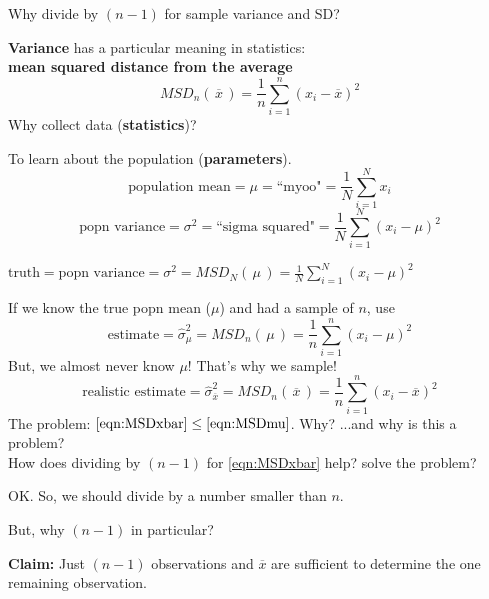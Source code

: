 \documentclass{beamer}\usepackage[]{graphicx}\usepackage[]{color}
\newcommand{\xbar}{\overline{x}}
\newcommand{\sigmahat}{\widehat{\sigma}}
\begin{document}
\begin{frame}{Why divide by $(n-1)$ for sample variance and SD?\;\;}
\vspace{0.25cm}

\textbf{Variance} has a particular meaning in
statistics: \\
\textbf{mean squared distance from the average}
\begin{equation*}
MSD_n(\,\xbar\,)
= \frac{1}{n}\sum_{i=1}^n (x_i-\xbar)^2
\end{equation*}
Why collect data (\textbf{statistics})?  

To learn about the population (\textbf{parameters}).
\begin{equation*}
\text{population mean} = \mu = \text{``myoo"}
= \frac{1}{N}\sum_{i=1}^N x_i
\end{equation*}
\begin{equation*}
\text{popn variance} = \sigma^2 = \text{``sigma squared"}
= \frac{1}{N}\sum_{i=1}^N (x_i-\mu)^2
\end{equation*}

\newpage
$\displaystyle{
\text{truth} = \text{popn variance}
= \sigma^2 = MSD_N(\,\mu\,) = \frac{1}{N}\sum_{i=1}^N (x_i-\mu)^2
}$
\vskip0.1cm

If we know the true popn mean ($\mu$)
and had a sample of $n$, use
\begin{equation}
\text{estimate}
= \sigmahat_{\mu}^2 = MSD_n(\,\mu\,) = \frac{1}{n}\sum_{i=1}^n (x_i-\mu)^2
\label{eqn:MSDmu}
\end{equation}
But, we almost never know $\mu$!  That's why we sample!
\begin{equation}
\text{realistic estimate}
= \sigmahat_{\xbar}^2 = MSD_n(\,\xbar\,) = \frac{1}{n}\sum_{i=1}^n (x_i-\xbar)^2
\label{eqn:MSDxbar}
\end{equation}
The problem: $\eqref{eqn:MSDxbar} \le \eqref{eqn:MSDmu}$.
\quad Why?\;\; ...and why is this a problem?\\
How does dividing by $(n-1)$ for \eqref{eqn:MSDxbar} help?
solve the problem?

\newpage
OK. So, we should divide by a number smaller than $n$.

But, why $(n-1)$ in particular?
\vskip0.25cm

\textbf{Claim:}\;
Just $(n-1)$ observations and $\xbar$ are sufficient
to determine the one remaining observation.
\vskip0.25cm


\end{frame}
\end{document}
